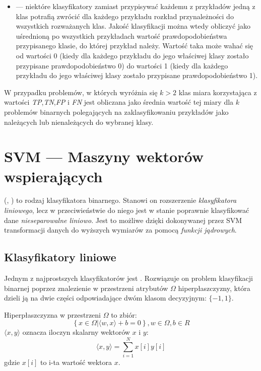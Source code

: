 \begin{itemize}
		\item {} --- niektóre klasyfikatory zamiast przypisywać każdemu z przykładów jedną z klas potrafią zwrócić dla każdego przykładu rozkład przynależności do wszystkich rozważanych klas. Jakość klasyfikacji można wtedy obliczyć jako uśrednioną po wszystkich przykładach wartość prawdopodobieństwa przypisanego klasie, do której przykład należy. Wartość taka może wahać się od wartości 0 (kiedy dla każdego przykładu do jego właściwej klasy zostało przypisane prawdopodobieństwo 0) do wartości 1 (kiedy dla każdego przykładu do jego właściwej klasy zostało przypisane prawdopodobieństwo 1).

	\end{itemize}		

	W przypadku problemów, w których wyróżnia się $ k>2 $ klas miara korzystająca z wartości  \emph{TP},\emph{TN},\emph{FP} i \emph{FN} jest obliczana jako średnia wartość tej miary dla $ k $ problemów binarnych polegających na zaklasyfikowaniu przykładów jako należących lub nienależących do wybranej klasy.


\section{SVM --- Maszyny wektorów wspierających}
    
 (, ) to rodzaj klasyfikatora binarnego. Stanowi on rozszerzenie \emph{klasyfikatora liniowego}, lecz w przeciwieństwie do niego jest w stanie poprawnie klasyfikować dane \emph{nieseparowalne liniowo}. Jest to możliwe dzięki dokonywanej przez SVM transformacji danych do wyższych wymiarów za pomocą \emph{funkcji jądrowych}.

\subsection{Klasyfikatory liniowe}
Jednym z najprostszych klasyfikatorów jest . Rozwiązuje on problem klasyfikacji binarnej poprzez znalezienie w przestrzeni atrybutów $ \Omega $ hiperpłaszczyzny, która dzieli ją na dwie części odpowiadające dwóm klasom decyzyjnym: $ \{-1, 1 \} $.
\begin{definicjaa}
Hiperpłaszczyzna w przestrzeni $ \Omega $ to zbiór:
\begin{equation}
\left\{ x \in \Omega | \langle w, x\rangle + b = 0 \right\}, w \in \Omega, b \in R
\label{eq:hyperplane}
\end{equation}
$ \langle x, y \rangle $ oznacza iloczyn skalarny wektorów $ x $ i $ y $:
$$ \langle x, y \rangle = \sum_{i=1}^{N} x[i] y[i] $$
gdzie $ x[i] $ to i-ta wartość wektora $ x $.
\end{definicjaa}

